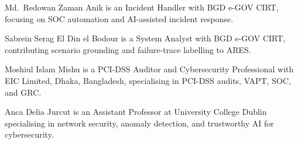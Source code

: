 \documentclass[journal,compsoc]{IEEEtran}
\newcommand{\ARES}{\textsc{ARES}}
\begin{document}
\begin{IEEEbiographynophoto}{Md.~Redowan Zaman Anik}
is an Incident Handler with BGD e-GOV CIRT, focusing on SOC
automation and AI-assisted incident response.
\end{IEEEbiographynophoto}

\begin{IEEEbiographynophoto}{Sabrein Serag El Din el Bodour}
is a System Analyst with BGD e-GOV CIRT, contributing scenario
grounding and failure-trace labelling to \ARES{}.
\end{IEEEbiographynophoto}

\begin{IEEEbiographynophoto}{Moshiul Islam Mishu}
is a PCI-DSS Auditor and Cybersecurity Professional with EIC Limited,
Dhaka, Bangladesh, specialising in PCI-DSS audits, VAPT, SOC, and GRC.
\end{IEEEbiographynophoto}

\begin{IEEEbiographynophoto}{Anca Delia Jurcut}
is an Assistant Professor at University College Dublin specialising
in network security, anomaly detection, and trustworthy AI for
cybersecurity.
\end{IEEEbiographynophoto}
\end{document}
